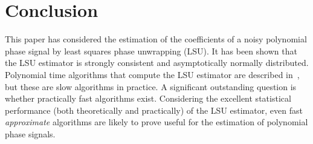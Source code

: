 \documentclass[aap,preprint]{imsart}
\begin{document}



\section{Conclusion} \label{sec:conclusion}
 
This paper has considered the estimation of the coefficients of a noisy polynomial phase signal by least squares phase unwrapping (LSU). It has been shown that the LSU estimator is strongly consistent and asymptotically normally distributed. %
Polynomial time algorithms that compute the LSU estimator are described in~\cite{McKilliam2010thesis}, but these are slow algorithms in practice.  A significant outstanding question is whether practically fast algorithms exist.  Considering the excellent statistical performance (both theoretically and practically) of the LSU estimator, even fast \emph{approximate} algorithms are likely to prove useful for the estimation of polynomial phase signals. 
  
\end{document}
